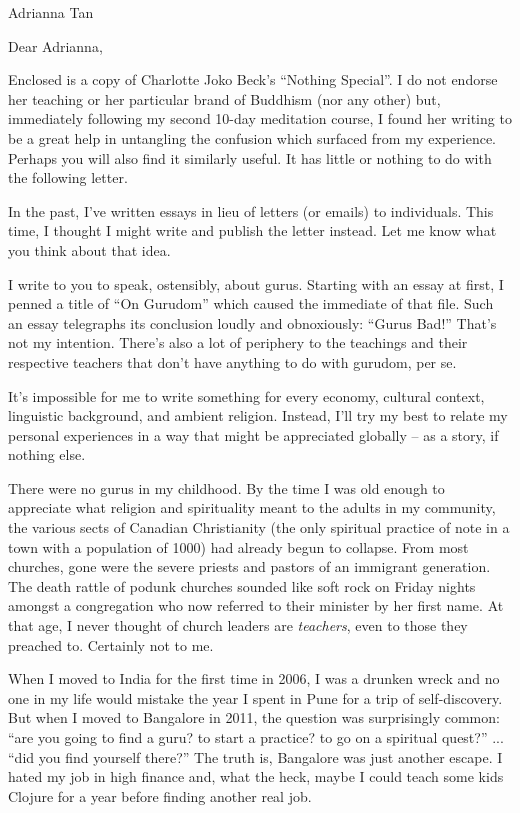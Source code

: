 \documentclass{letter}
\newcommand\hr{\par\vspace{-.5\ht\strutbox}\noindent\hrulefill\par}
\begin{document}
\begin{letter}{Adrianna Tan}
\opening{Dear Adrianna,}

Enclosed is a copy of Charlotte Joko Beck's ``Nothing Special''.
I do not endorse her teaching or her particular brand of Buddhism (nor any other) but, immediately following my second 10-day meditation course, I found her writing to be a great help in untangling the confusion which surfaced from my experience.
Perhaps you will also find it similarly useful.
It has little or nothing to do with the following letter.

In the past, I've written essays in lieu of letters (or emails) to individuals.
This time, I thought I might write and publish the letter instead.
Let me know what you think about that idea.

I write to you to speak, ostensibly, about gurus.
Starting with an essay at first, I penned a title of ``On Gurudom'' which caused the immediate  of that file.
Such an essay telegraphs its conclusion loudly and obnoxiously: ``Gurus Bad!''
That's not my intention.
There's also a lot of periphery to the teachings and their respective teachers that don't have anything to do with gurudom, per se.

It's impossible for me to write something for every economy, cultural context, linguistic background, and ambient religion.
Instead, I'll try my best to relate my personal experiences in a way that might be appreciated globally -- as a story, if nothing else.

\hr

There were no gurus in my childhood.
By the time I was old enough to appreciate what religion and spirituality meant to the adults in my community, the various sects of Canadian Christianity (the only spiritual practice of note in a town with a population of 1000) had already begun to collapse.
From most churches, gone were the severe priests and pastors of an immigrant generation.
The death rattle of podunk churches sounded like soft rock on Friday nights amongst a congregation who now referred to their minister by her first name.
At that age, I never thought of church leaders are \textit{teachers}, even to those they preached to.
Certainly not to me.

When I moved to India for the first time in 2006, I was a drunken wreck and no one in my life would mistake the year I spent in Pune for a trip of self-discovery.
But when I moved to Bangalore in 2011, the question was surprisingly common: ``are you going to find a guru? to start a practice? to go on a spiritual quest?'' ... ``did you find yourself there?''
The truth is, Bangalore was just another escape.
I hated my job in high finance and, what the heck, maybe I could teach some kids Clojure for a year before finding another real job.


\end{letter}
\end{document}
